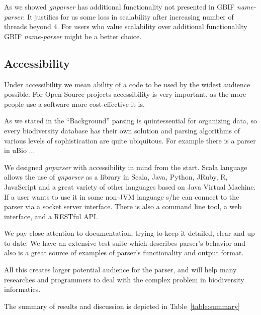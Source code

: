 \documentclass{bmcart}
\begin{document}
As we showed \textit{gnparser} has additional functionality not presented in
GBIF \textit{name-parser}. It justifies for us some loss in scalability after
increasing number of threads beyond 4. For users who value scalability over
additional functionalilty GBIF \textit{name-parser} might be a better choice.

\subsection*{Accessibility}

Under accessibility we mean ability of a code to be used by the widest
audience possible. For Open Source projects accessibility is very important,
as the more people use a software more cost-effective it is.

As we stated in the ``Background'' parsing is quintessential for organizing
data, so every biodiversity database has their own solution and
parsing algorithms of various levels of sophistication are quite ubiquitous.
For example there is a parser in uBio \cite{ubio:parser}...

We designed \textit{gnparser} with accessibility in mind from the start. Scala
language allows the use of \textit{gnparser} as a library in Scala, Java,
Python, JRuby, R, JavaScript and a great variety of other languages based on
Java Virtual Machine. If a user wants to use it in some non-JVM language s/he
can connect to the parser via a socket server interface. There is also a
command line tool, a web interface, and a RESTful API.

We pay close attention to documentation, trying to keep it detailed, clear and
up to date. We have an extensive test suite which describes parser's behavior
and also is a great source of examples of parser's functionality and output
format.

All this creates larger potential audience for the parser, and will help many
researches and programmers to deal with the complex problem in biodiversity
informatics.

The summary of results and discussion is depicted in
Table~\ref{table:summary}
\end{document}
